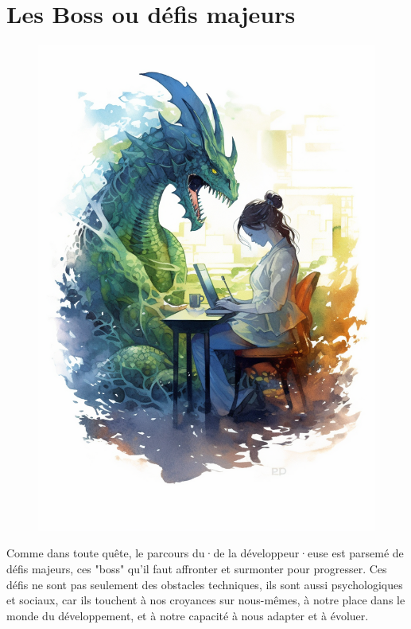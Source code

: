 \part*{Les Boss ou défis majeurs}
\markboth{}{}
\setcounter{tocdepth}{1}
\setcounter{chapter}{0}

\begin{figure}[H]
    \center
    \includegraphics[keepaspectratio, width=\textwidth, height=\textheight]{images/599be801-3f3e-497a-b8d3-9b588259a13f.png}
\end{figure}

Comme dans toute quête, le parcours du·de la développeur·euse est parsemé de défis majeurs, ces "boss" qu'il faut affronter et surmonter pour progresser. Ces défis ne sont pas seulement des obstacles techniques, ils sont aussi psychologiques et sociaux, car ils touchent à nos croyances sur nous-mêmes, à notre place dans le monde du développement, et à notre capacité à nous adapter et à évoluer.

